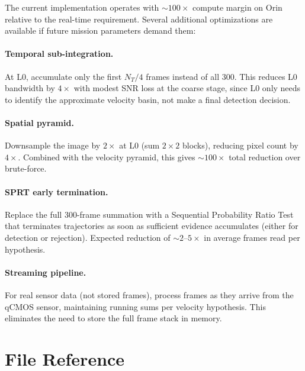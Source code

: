 \documentclass[11pt,letterpaper]{article}
\begin{document}
The current implementation operates with ${\sim}100\times$ compute margin
on Orin relative to the real-time requirement. Several additional
optimizations are available if future mission parameters demand them:

\paragraph{Temporal sub-integration.}
At L0, accumulate only the first $N_T/4$ frames instead of all 300.
This reduces L0 bandwidth by $4\times$ with modest SNR loss at the
coarse stage, since L0 only needs to identify the approximate velocity
basin, not make a final detection decision.

\paragraph{Spatial pyramid.}
Downsample the image by $2\times$ at L0 (sum $2\times 2$ blocks), reducing
pixel count by $4\times$. Combined with the velocity pyramid, this
gives ${\sim}100\times$ total reduction over brute-force.

\paragraph{SPRT early termination.}
Replace the full 300-frame summation with a Sequential Probability
Ratio Test that terminates trajectories as soon as sufficient evidence
accumulates (either for detection or rejection). Expected reduction
of ${\sim}2$--$5\times$ in average frames read per hypothesis.

\paragraph{Streaming pipeline.}
For real sensor data (not stored frames), process frames as they
arrive from the qCMOS sensor, maintaining running sums per velocity
hypothesis. This eliminates the need to store the full frame stack
in memory.

\section{File Reference}
\label{sec:reference}
\end{document}
